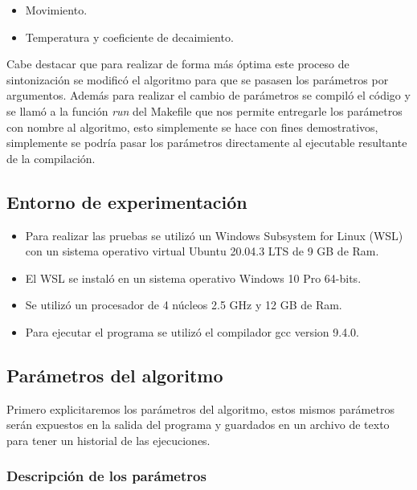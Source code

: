 \begin{itemize}
    \item Movimiento.
    \item Temperatura y coeficiente de decaimiento.
\end{itemize}

Cabe destacar que para realizar de forma más óptima este proceso de sintonización se modificó el algoritmo para que se pasasen los parámetros por argumentos. Además para realizar el cambio de parámetros se compiló el código y se llamó a la función \textit{run} del Makefile que nos permite entregarle los parámetros con nombre al algoritmo, esto simplemente se hace con fines demostrativos, simplemente se podría pasar los parámetros directamente al ejecutable resultante de la compilación.

\subsection{Entorno de experimentación}

\begin{itemize}
    \item Para realizar las pruebas se utilizó un Windows Subsystem for Linux (WSL) con un sistema operativo virtual Ubuntu 20.04.3 LTS de 9 GB de Ram.
    \item El WSL se instaló en un sistema operativo Windows 10 Pro 64-bits.
    \item Se utilizó un procesador de 4 núcleos  2.5 GHz y 12 GB de Ram.
    \item Para ejecutar el programa se utilizó el compilador gcc version 9.4.0.
\end{itemize}

\subsection{Parámetros del algoritmo}

Primero explicitaremos los parámetros del algoritmo, estos mismos parámetros serán expuestos en la salida del programa y guardados en un archivo de texto para tener un historial de las ejecuciones.

\subsubsection{Descripción de los parámetros}

